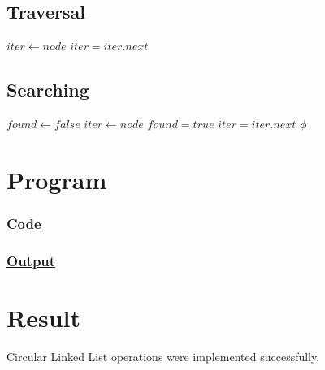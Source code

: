 \subsection{Traversal}

{\Large\color{white}
\begin{algorithmic}[1]
			\State $iter \gets node$
			\Repeat
				\State {}
				\State $iter = iter.next$
		\EndIf
	\EndFunction
\end{algorithmic}
\color{black}}

\subsection{Searching}

{\Large\color{white}
\begin{algorithmic}[1]
		\State $found \gets false$
			\State $iter \gets node$
			\Repeat
					\State $found = true$
				\EndIf
				\State $iter = iter.next$
		\EndIf
		\State \Return $\phi$
	\EndFunction
\end{algorithmic}
\color{black}}

\section{Program}

\subsubsection{\underline{Code}}



\clearpage

\subsubsection{\underline{Output}}



\vfill

\section{Result}
{\Large\color{white}
Circular Linked List operations were implemented successfully.
\color{black}}

\clearpage
